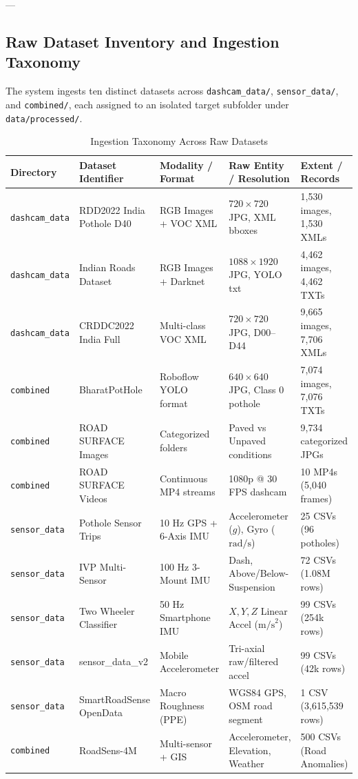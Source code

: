 ---

\subsection{Raw Dataset Inventory and Ingestion Taxonomy}
The system ingests ten distinct datasets across \texttt{dashcam\_data/}, \texttt{sensor\_data/}, and \texttt{combined/}, each assigned to an isolated target subfolder under \texttt{data/processed/}.

\begin{table}[htbp]
\centering
\scriptsize
\caption{Ingestion Taxonomy Across Raw Datasets}
\label{tab:raw_taxonomy}
\begin{tabularx}{\textwidth}{lp{3.2cm}p{2.6cm}p{3.5cm}X}
\toprule
\textbf{Directory} & \textbf{Dataset Identifier} & \textbf{Modality / Format} & \textbf{Raw Entity / Resolution} & \textbf{Extent / Records} \\
\midrule
\texttt{dashcam\_data} & RDD2022 India Pothole D40 & RGB Images + VOC XML & $720\times720$ JPG, XML bboxes & 1,530 images, 1,530 XMLs \\
\texttt{dashcam\_data} & Indian Roads Dataset & RGB Images + Darknet & $1088\times1920$ JPG, YOLO txt & 4,462 images, 4,462 TXTs \\
\texttt{dashcam\_data} & CRDDC2022 India Full & Multi-class VOC XML & $720\times720$ JPG, D00--D44 & 9,665 images, 7,706 XMLs \\
\texttt{combined} & BharatPotHole & Roboflow YOLO format & $640\times640$ JPG, Class 0 pothole & 7,074 images, 7,076 TXTs \\
\texttt{combined} & ROAD SURFACE Images & Categorized folders & Paved vs Unpaved conditions & 9,734 categorized JPGs \\
\texttt{combined} & ROAD SURFACE Videos & Continuous MP4 streams & 1080p @ 30 FPS dashcam & 10 MP4s (5,040 frames) \\
\texttt{sensor\_data} & Pothole Sensor Trips & 10 Hz GPS + 6-Axis IMU & Accelerometer ($g$), Gyro ($\text{rad/s}$) & 25 CSVs (96 potholes) \\
\texttt{sensor\_data} & IVP Multi-Sensor & 100 Hz 3-Mount IMU & Dash, Above/Below-Suspension & 72 CSVs (1.08M rows) \\
\texttt{sensor\_data} & Two Wheeler Classifier & 50 Hz Smartphone IMU & $X, Y, Z$ Linear Accel ($\text{m/s}^2$) & 99 CSVs (254k rows) \\
\texttt{sensor\_data} & sensor\_data\_v2 & Mobile Accelerometer & Tri-axial raw/filtered accel & 99 CSVs (42k rows) \\
\texttt{sensor\_data} & SmartRoadSense OpenData & Macro Roughness (PPE) & WGS84 GPS, OSM road segment & 1 CSV (3,615,539 rows) \\
\texttt{combined} & RoadSens-4M & Multi-sensor + GIS & Accelerometer, Elevation, Weather & 500 CSVs (Road Anomalies) \\
\bottomrule
\end{tabularx}
\end{table}

